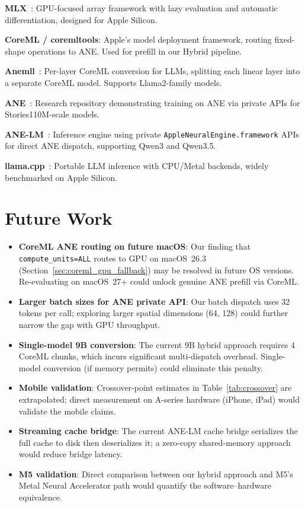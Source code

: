 \documentclass[11pt]{article}
\begin{document}
\textbf{MLX}~\cite{mlx}: GPU-focused array framework with lazy evaluation
and automatic differentiation, designed for Apple Silicon.

\textbf{CoreML / coremltools}: Apple's model deployment framework, routing
fixed-shape operations to ANE.
Used for prefill in our Hybrid pipeline.

\textbf{Anemll}~\cite{anemll}: Per-layer CoreML conversion for LLMs,
splitting each linear layer into a separate CoreML model.
Supports Llama2-family models.

\textbf{ANE}~\cite{ane}: Research repository demonstrating training on ANE
via private APIs for Stories110M-scale models.

\textbf{ANE-LM}~\cite{anelm}: Inference engine using private
\texttt{AppleNeuralEngine.framework} APIs for direct ANE dispatch,
supporting Qwen3 and Qwen3.5.

\textbf{llama.cpp}~\cite{llamacpp}: Portable LLM inference with CPU/Metal
backends, widely benchmarked on Apple Silicon.

\section{Future Work}
\label{sec:future}

\begin{itemize}[topsep=2pt,itemsep=1pt]
  \item \textbf{CoreML ANE routing on future macOS}: Our finding that
    \texttt{compute\_units=ALL} routes to GPU on macOS~26.3
    (Section~\ref{sec:coreml_gpu_fallback}) may be resolved in future OS
    versions. Re-evaluating on macOS~27+ could unlock genuine ANE prefill
    via CoreML.
  \item \textbf{Larger batch sizes for ANE private API}: Our batch dispatch
    uses 32 tokens per call; exploring larger spatial dimensions (64, 128)
    could further narrow the gap with GPU throughput.
  \item \textbf{Single-model 9B conversion}: The current 9B hybrid approach
    requires 4 CoreML chunks, which incurs significant multi-dispatch overhead.
    Single-model conversion (if memory permits) could eliminate this penalty.
  \item \textbf{Mobile validation}: Crossover-point estimates in
    Table~\ref{tab:crossover} are extrapolated; direct measurement on
    A-series hardware (iPhone, iPad) would validate the mobile claims.
  \item \textbf{Streaming cache bridge}: The current ANE-LM cache bridge
    serializes the full cache to disk then deserializes it; a zero-copy
    shared-memory approach would reduce bridge latency.
  \item \textbf{M5 validation}: Direct comparison between our hybrid
    approach and M5's Metal Neural Accelerator path would quantify
    the software--hardware equivalence.
\end{itemize}
\end{document}
